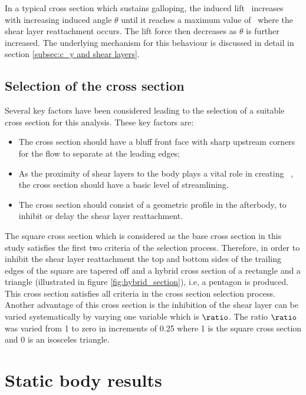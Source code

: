 In a typical cross section which sustains galloping, the induced lift \cy\ increases with increasing induced angle $\theta$ until it reaches a maximum value of \cy\ where the shear layer reattachment occurs. The lift force then decreases as $\theta$ is further increased. The underlying mechanism for this behaviour is discussed in detail in section \ref{subsec:c_y and shear layers}.   

\subsection*{Selection of the cross section}



Several key factors have been considered leading to the selection of a suitable cross section for this analysis. These key factors are:

\begin{itemize}
\item The cross section should have a bluff front face with sharp upstream corners for the flow to separate at the leading edges;

\item As the proximity of shear layers to the body plays a vital role in creating \cy\ \citep{Parkinson1989}, the cross section should have a basic level of streamlining.

\item The cross section should consist of a geometric profile in the afterbody, to inhibit or delay the shear layer reattachment.   
\end{itemize}

The square cross section which is considered as the base cross section in this study satisfies the first two criteria of the selection process. Therefore, in order to inhibit the shear layer reattachment the top and bottom sides of the trailing edges of the square are tapered off and a hybrid cross section of a rectangle and a triangle (illustrated in figure \ref{fig:hybrid_section}), i.e, a pentagon is produced. This cross section satisfies all criteria in the cross section selection process. Another advantage of this cross section is the inhibition of the shear layer can be varied systematically by varying one variable which is $\ratio$. The ratio $\ratio$ was varied from 1 to zero in increments of 0.25 where 1 is the square cross section and 0 is an isosceles triangle. 


\section{Static body results}
\label{sec:cross-sec-Static body results}

